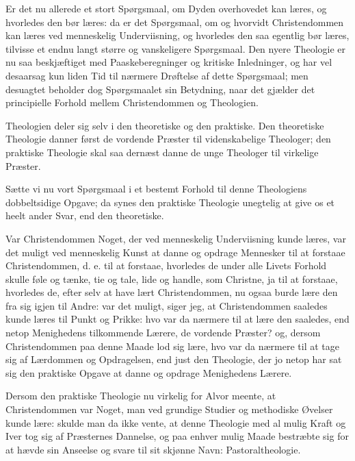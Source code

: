 \documentclass[12pt,a4paper]{book}
\newcommand{\opage}[1]{\marginnote{\footnotesize\textit{[#1]}}}
\begin{document}
Er det nu allerede et stort Spørgsmaal, om Dyden overhovedet kan læres, og
hvorledes den bør læres: da er det Spørgsmaal, om og hvorvidt
Christendommen kan læres ved menneskelig Underviisning, og hvorledes den
saa egentlig bør læres, tilvisse et endnu langt større og vanskeligere
Spørgsmaal. Den nyere Theologie er nu saa beskjæftiget med
Paaskeberegninger og kritiske Inledninger, og har vel desaarsag kun liden
Tid til nærmere Drøftelse af dette Spørgsmaal; men desuagtet beholder dog
Spørgsmaalet sin Betydning, naar det gjælder det principielle Forhold
mellem Christendommen og Theologien.

\opage{130} Theologien deler sig selv i den theoretiske og den praktiske. Den
theoretiske Theologie danner først de vordende Præster til videnskabelige
Theologer; den praktiske Theologie skal saa dernæst danne de unge
Theologer til virkelige Præster.

Sætte vi nu vort Spørgsmaal i et bestemt Forhold til denne Theologiens
dobbeltsidige Opgave; da synes den praktiske Theologie unegtelig at give os
et heelt ander Svar, end den theoretiske.

Var Christendommen Noget, der ved menneskelig Underviisning kunde læres,
var det muligt ved menneskelig Kunst at danne og opdrage Mennesker til at
forstaae Christendommen, d. e. til at forstaae, hvorledes de under alle
Livets Forhold skulle føle og tænke, tie og tale, lide og handle, som
Christne, ja til at forstaae, hvorledes de, efter selv at have lært
Christendommen, nu ogsaa burde lære den fra sig igjen til Andre: var det
muligt, siger jeg, at Christendommen saaledes kunde læres til Punkt og
Prikke: hvo var da nærmere til at lære den saaledes, end netop Menighedens
tilkommende Lærere, de vordende Præster? og, dersom Christendommen paa
denne Maade lod sig lære, hvo var da nærmere til at tage sig af Lærdommen
og Opdragelsen, end just den Theologie, der jo netop har sat sig den
praktiske Opgave at danne og opdrage Menighedens Lærere.

Dersom den praktiske Theologie nu virkelig for Alvor meente, at
Christendommen var Noget, man ved grundige Studier og methodiske Øvelser
kunde lære: skulde man da ikke vente, at denne Theologie med al mulig Kraft
og Iver tog sig af Præsternes Dannelse, og paa enhver mulig Maade
bestræbte sig for at hævde sin Anseelse og svare til sit skjønne Navn:
Pastoraltheologie.
\end{document}
